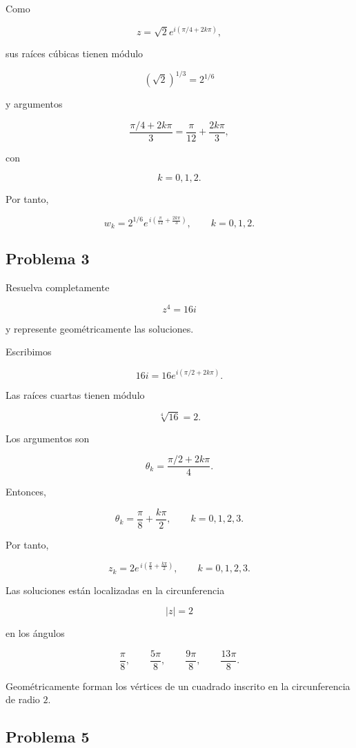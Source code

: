 \documentclass[12pt]{article}
\begin{document}
Como

\[
z
=
\sqrt2
e^{i(\pi/4+2k\pi)},
\]

sus raíces cúbicas tienen módulo

\[
(\sqrt2)^{1/3}
=
2^{1/6}
\]

y argumentos

\[
\frac{\pi/4+2k\pi}{3}
=
\frac{\pi}{12}
+
\frac{2k\pi}{3},
\]

con

\[
k=0,1,2.
\]

Por tanto,

\[
\boxed{
w_k
=
2^{1/6}
e^{\,i\left(
\frac{\pi}{12}+\frac{2k\pi}{3}
\right)},
\qquad k=0,1,2
}.
\]


\subsection*{Problema 3}

Resuelva completamente

\[
z^4=16i
\]

y represente geométricamente las soluciones.

Escribimos

\[
16i
=
16e^{i(\pi/2+2k\pi)}.
\]

Las raíces cuartas tienen módulo

\[
\sqrt[4]{16}=2.
\]

Los argumentos son

\[
\theta_k
=
\frac{\pi/2+2k\pi}{4}.
\]

Entonces,

\[
\theta_k
=
\frac{\pi}{8}
+
\frac{k\pi}{2},
\qquad
k=0,1,2,3.
\]

Por tanto,

\[
\boxed{
z_k
=
2e^{\,i\left(
\frac{\pi}{8}+\frac{k\pi}{2}
\right)},
\qquad k=0,1,2,3
}.
\]

Las soluciones están localizadas en la circunferencia

\[
|z|=2
\]

en los ángulos

\[
\frac{\pi}{8},
\qquad
\frac{5\pi}{8},
\qquad
\frac{9\pi}{8},
\qquad
\frac{13\pi}{8}.
\]

Geométricamente forman los vértices de un cuadrado inscrito en la
circunferencia de radio \(2\).


\subsection*{Problema 5}
\end{document}
